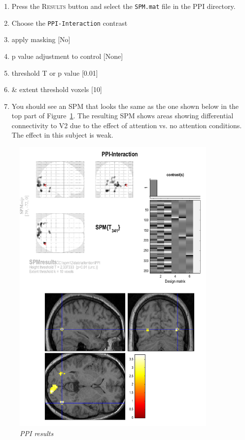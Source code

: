 \begin{enumerate}
\item Press the \textsc{Results} button and select the \texttt{SPM.mat} file in the PPI directory.
\item Choose the \texttt{PPI-Interaction} contrast
\item apply masking [No]
\item p value adjustment to control [None]
\item threshold {T or p value} [0.01]
\item \& extent threshold {voxels} [10]
\item You should see an SPM that looks the same as the one shown below in the top part of Figure~\ref{fig:ppi15}. The resulting SPM shows areas showing differential connectivity to V2 due to the effect of attention vs. no attention conditions. The effect in this subject is weak.
\end{enumerate}

\begin{figure}[!ht]
\centering\includegraphics[width=100mm]{ppi/figures/Fig15.png}
\caption{\em PPI results}
\label{fig:ppi15}
\end{figure}

